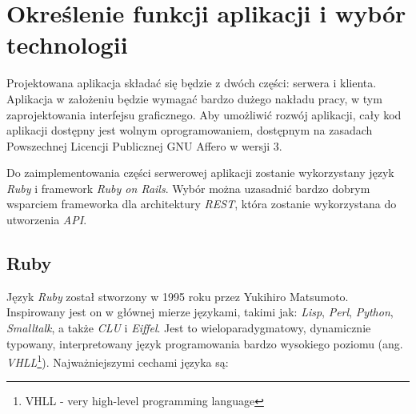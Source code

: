 \documentclass[11pt,twoside]{report}
\begin{document}
\cleardoublepage

\chapter{Określenie funkcji aplikacji i wybór technologii}
Projektowana aplikacja składać się będzie z dwóch części: serwera i
klienta. Aplikacja w założeniu będzie wymagać bardzo dużego nakładu
pracy, w tym zaprojektowania interfejsu graficznego. Aby umożliwić
rozwój aplikacji, cały kod aplikacji dostępny jest wolnym
oprogramowaniem, dostępnym na zasadach Powszechnej Licencji Publicznej
GNU Affero w wersji 3\cite{affero}.

Do zaimplementowania części serwerowej aplikacji zostanie wykorzystany
język \emph{Ruby} i framework \emph{Ruby on Rails}. Wybór można
uzasadnić bardzo dobrym wsparciem frameworka dla architektury
\emph{REST}, która zostanie wykorzystana do utworzenia \emph{API}.

\section{Ruby}
Język \emph{Ruby} został stworzony w 1995 roku przez Yukihiro
Matsumoto. Inspirowany jest on w głównej mierze językami, takimi jak:
\emph{Lisp}, \emph{Perl}, \emph{Python}, \emph{Smalltalk}, a także
\emph{CLU} i \emph{Eiffel}. Jest to wieloparadygmatowy, dynamicznie
typowany, interpretowany język programowania bardzo wysokiego poziomu
(ang. \emph{VHLL}\footnote{VHLL - very high-level programming
  language})\cite{ruby}. Najważniejszymi cechami języka są:
\end{document}
